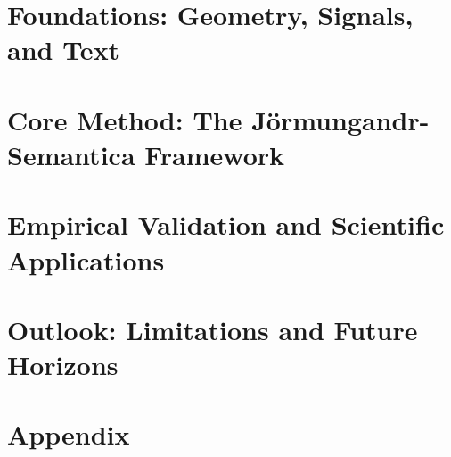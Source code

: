 




\maketitle

\tableofcontents
\newpage

\part{Foundations: Geometry, Signals, and Text}




\part{Core Method: The Jörmungandr-Semantica Framework}




\part{Empirical Validation and Scientific Applications}



\part{Outlook: Limitations and Future Horizons}


\newpage



\appendix
\part*{Appendix}


